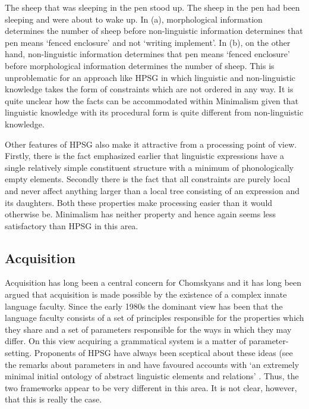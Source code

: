\documentclass[output=paper]{langsci/langscibook}
\begin{document}
\eal
\ex The sheep that was sleeping in the pen stood up.
\ex The sheep in the pen had been sleeping and were about to wake up.
\zl
In (a), morphological information determines the number of sheep before non-linguistic
information determines that pen means ‘fenced enclosure’ and not ‘writing implement’. In (b),
on the other hand, non-linguistic information determines that pen means ‘fenced enclosure’ before
morphological information determines the number of sheep. This is unproblematic for an approach like
HPSG in which linguistic and non-linguistic knowledge takes the form of constraints which are not
ordered in any way. It is quite unclear how the facts can be accommodated within Minimalism given
that linguistic knowledge with its procedural form is quite different from non-linguistic
knowledge. 

Other features of HPSG also make it attractive from a processing point of view. Firstly, there is
the fact emphasized earlier that linguistic expressions have a single relatively simple constituent
structure with a minimum of phonologically empty elements. Secondly there is the fact that all
constraints are purely local and never affect anything larger than a local tree consisting of an
expression and its daughters. Both these properties make processing easier than it would otherwise
be. Minimalism has neither property and hence again seems less satisfactory than HPSG in this area. 


\subsection{Acquisition}
\label{sec:min-restrictive}

Acquisition has long been a central concern for Chomskyans and it has long been argued that
acquisition is made possible by the existence of a complex innate language faculty. Since the early
1980s the dominant view has been that the language faculty consists of a set of principles
responsible for the properties which they share and a set of parameters responsible for the ways in
which they may differ. On this view acquiring a grammatical system is a matter of
parameter-setting. Proponents of HPSG have always been sceptical about these ideas (see \eg the
remarks about parameters in  and have favoured accounts with ‘an extremely
minimal initial ontology of abstract linguistic elements and relations’ \citep[]{Green2011a}. Thus, the
two frameworks appear to be very different in this area. It is not clear, however, that this is
really the case.
\end{document}

